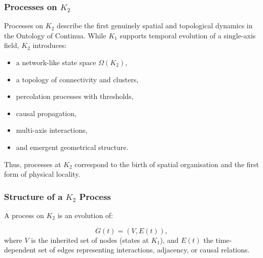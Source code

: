 

\subsubsection{Processes on \texorpdfstring{$K_2$}{K_2}}
\label{sec:processes-k2}

Processes on $K_2$ describe the first genuinely spatial and topological
dynamics in the Ontology of Continua. While $K_1$ supports temporal
evolution of a single-axis field, $K_2$ introduces:

\begin{itemize}
    \item a network-like state space $\Omega(K_2)$,
    \item a topology of connectivity and clusters,
    \item percolation processes with thresholds,
    \item causal propagation,
    \item multi-axis interactions,
    \item and emergent geometrical structure.
\end{itemize}

Thus, processes at $K_2$ correspond to the birth of spatial organisation
and the first form of physical locality.

\subsubsection{Structure of a \texorpdfstring{$K_2$}{K_2} Process}

A process on $K_2$ is an evolution of:

\[
G(t) = (V, E(t)),
\]
where $V$ is the inherited set of nodes (states at $K_1$), and $E(t)$
the time-dependent set of edges representing interactions, adjacency,
or causal relations.

